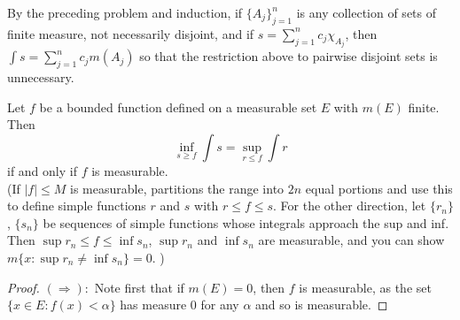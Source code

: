 \begin{rmk}%
	By the preceding problem and induction, if $\{A_j\}_{j=1}^n$ is any collection of 
	sets of finite measure, not necessarily disjoint, and if 
	$s = \sum\limits_{j=1}^n c_j\chi_{A_j}$, then $\int s = \sum\limits_{j=1}^n c_j m(A_j)$ 
	so that the restriction above to pairwise disjoint sets is unnecessary. 
\end{rmk}

\begin{pblm}\label{p:infinteqsupint}%
	Let $f$ be a bounded function defined on a measurable set $E$ with $m(E)$ finite. Then 
	\begin{equation*}
		\inf\limits_{s\ge f}\int s = \sup\limits_{r \le f}\int r
	\end{equation*}
	if and only if $f$ is measurable. \\
	{\scriptsize{(If $|f| \le M$ is measurable, partitions the range into $2n$ equal portions and use 
	this to define simple functions $r$ and $s$ with $r \le f \le s$. For the other 
	direction, let $\{r_n\}$, $\{s_n\}$ be sequences of simple functions whose integrals 
	approach the sup and inf. Then $\sup r_n\le f\le\inf s_n$, $\sup r_n$ and $\inf s_n$ 
	are measurable, and you can show $m\{x: \sup r_n \neq\inf s_n\} = 0$. )}}
\begin{proof}
	$(\Rightarrow): $ 
	Note first that if $m(E) = 0$, then $f$ is measurable, as the set 
	$\{x \in E: f(x) < \alpha\}$ has measure 0 for any $\alpha$ and so is measurable. 


\end{proof}
\end{pblm}
